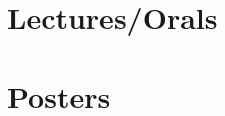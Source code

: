 \documentclass[a4paper]{article}
\begin{document}
\section{Lectures/Orals}


\section{Posters}

\end{document}
